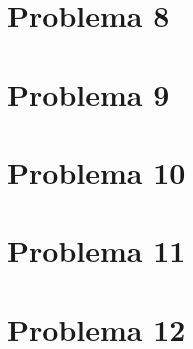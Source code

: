 \color{black}
	



	\section{Problema 8}
\color{blue}

\color{black}
	



	\section{Problema 9}
\color{blue}

\color{black}
	



	\section{Problema 10}
\color{blue}

\color{black}
	



	\section{Problema 11}
\color{blue}

\color{black}
	



	\section{Problema 12}
\color{blue}

\color{black}
	


